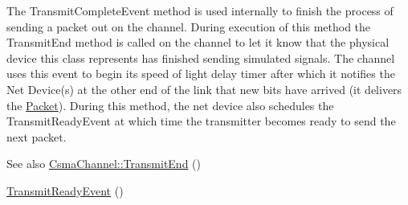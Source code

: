 The Transmit\+Complete\+Event method is used internally to finish the process of sending a packet out on the channel. During execution of this method the Transmit\+End method is called on the channel to let it know that the physical device this class represents has finished sending simulated signals. The channel uses this event to begin its speed of light delay timer after which it notifies the Net Device(s) at the other end of the link that new bits have arrived (it delivers the \hyperlink{classns3_1_1Packet}{Packet}). During this method, the net device also schedules the Transmit\+Ready\+Event at which time the transmitter becomes ready to send the next packet.

\begin{DoxySeeAlso}{See also}
\hyperlink{classns3_1_1CsmaChannel_a720272c5f63d9bdd32d7ca43925ee6d2}{Csma\+Channel\+::\+Transmit\+End} () 

\hyperlink{classns3_1_1CsmaNetDevice_a2cb06577684f06daca6c24b4ef4e8910}{Transmit\+Ready\+Event} () 
\end{DoxySeeAlso}

